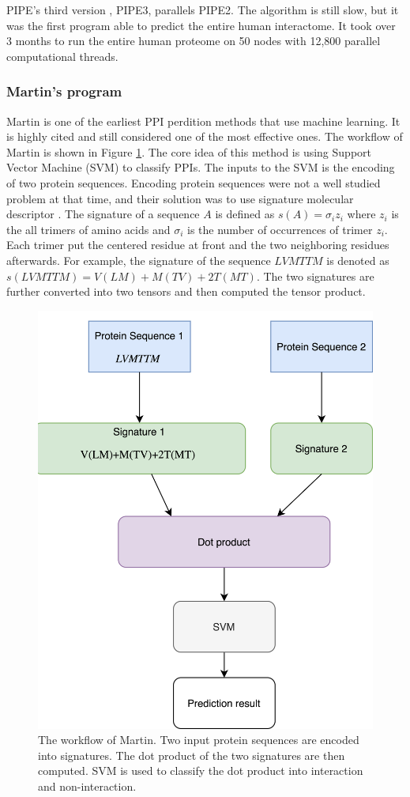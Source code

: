 PIPE's third version \cite{schoenrock2011mp}, PIPE3, parallels PIPE2. The algorithm is still slow, but it was the first program able to predict the entire human interactome. It took over 3 months to run the entire human proteome on 50 nodes with 12,800 parallel computational threads.

\subsubsection{Martin's program}
Martin \cite{Martin05_PPIpred} is one of the earliest PPI perdition methods that use machine learning. It is highly cited and still considered one of the most effective ones. The workflow of Martin is shown in Figure \ref{fig_Martin}. The core idea of this method is using Support Vector Machine (SVM) \cite{hearst1998support} to classify PPIs. The inputs to the SVM is the encoding of two protein sequences. Encoding protein sequences were not a well studied problem at that time, and their solution was to use signature molecular descriptor \cite{visco2002developing, faulon2003signature1, faulon2003signature2}. The signature of a sequence $A$ is defined as $s(A) = \sigma_iz_i$ where $z_i$ is the all trimers of amino acids and $\sigma_i$ is the number of occurrences of trimer $z_i$. Each trimer put the centered residue at front and the two neighboring residues afterwards. For example, the signature of the sequence $LVMTTM$ is denoted as $s(LVMTTM) = V(LM)+M(TV)+2T(MT)$. The two signatures are further converted into two tensors and then computed the tensor product.
\begin{figure}[h!]
\begin{center}
\includegraphics[height =7 cm]{img/sigProd.png}
\caption[The workflow of Martin]{The workflow of Martin. Two input protein sequences are encoded into signatures. The dot product of the two signatures are then computed. SVM is used to classify the dot product into interaction and non-interaction.  \label{fig_Martin}}
\end{center}
\end{figure} 


